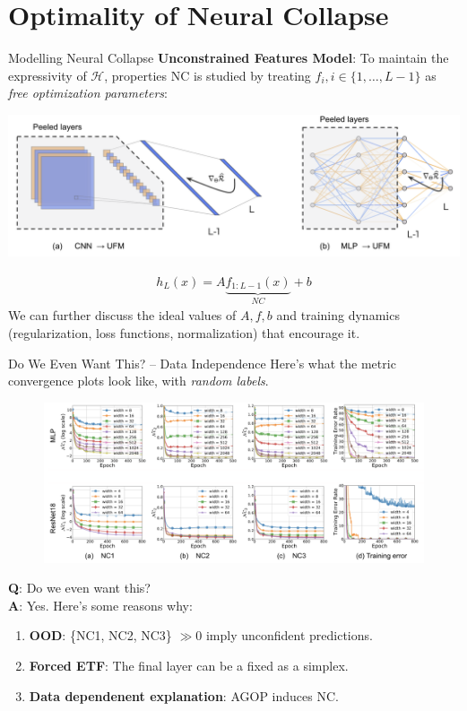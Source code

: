 \documentclass{beamer}
\begin{document}
\section{Optimality of Neural Collapse}
\begin{frame}{Modelling Neural Collapse}
	\textbf{Unconstrained Features Model}: To maintain the expressivity of $\mathcal{H}$, properties NC is studied by treating $f_i, i \in \{1, \ldots, L-1\}$ as \textit{free optimization parameters}:
	\begin{center}
		\includegraphics[width=\textwidth]{img/ufm.png}
	\end{center}
	\vspace{-1.5em}
	\begin{gather}
		h_L(x) = A \underbrace{f_{1:L-1}(x)}_{NC} + b
	\end{gather} \pause
	We can further discuss the ideal values of $A, f, b$ and training dynamics (regularization, loss functions, normalization) that encourage it.
\end{frame}

\begin{frame}{Do We Even Want This? -- Data Independence}
	Here's what the metric convergence plots look like, with \textit{random labels}.
	\begin{figure}[H]
		\centering
		\includegraphics[width=.78\textwidth]{img/nc_random_labels.png}
	\end{figure} \pause
	\vspace{-1em}
	\textbf{Q}: Do we even want this? \pause \\
	\textbf{A}: Yes. Here's some reasons why:
	\begin{enumerate}[label=\arabic*.]
		\item \textbf{OOD}: \{NC1, NC2, NC3\} $\gg 0$ imply unconfident predictions. \pause
		\item \textbf{Forced ETF}: The final layer can be a fixed as a simplex. \pause
		\item \textbf{Data dependenent explanation}: AGOP induces NC.
	\end{enumerate}
\end{frame}
\end{document}
